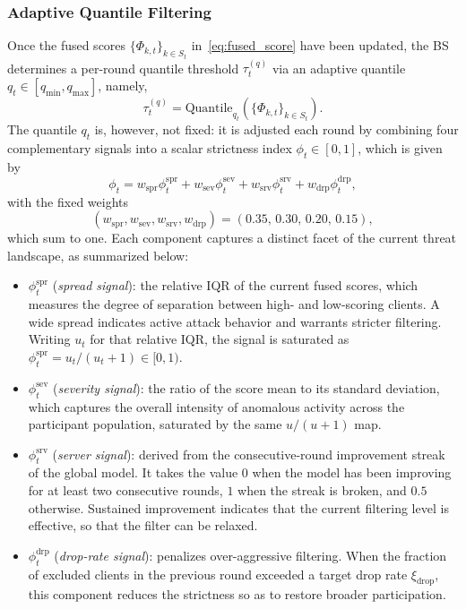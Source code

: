 \documentclass[journal]{IEEEtran}
\begin{document}
\subsubsection{Adaptive Quantile Filtering}
Once the fused scores $\{\Phi_{k,t}\}_{k\in S_t}$ in~\eqref{eq:fused_score} have been updated, the BS determines a per-round quantile threshold $\tau_t^{(q)}$ via an adaptive quantile $q_t \in [q_{\min}, q_{\max}]$, namely,
\begin{equation}
\tau_t^{(q)} = \text{Quantile}_{q_t}\!\left(\{\Phi_{k,t}\}_{k \in S_t}\right).
\label{eq:filt_threshold}
\end{equation}
The quantile $q_t$ is, however, not fixed: it is adjusted each round by combining four complementary signals into a scalar strictness index $\phi_t \in [0,1]$, which is given by
\begin{equation}
\phi_t = w_{\mathrm{spr}} \phi_t^{\mathrm{spr}} + w_{\mathrm{sev}} \phi_t^{\mathrm{sev}} + w_{\mathrm{srv}} \phi_t^{\mathrm{srv}} + w_{\mathrm{drp}} \phi_t^{\mathrm{drp}},
\label{eq:strictness}
\end{equation}
with the fixed weights
\begin{equation}
(w_{\mathrm{spr}}, w_{\mathrm{sev}}, w_{\mathrm{srv}}, w_{\mathrm{drp}}) = (0.35,\, 0.30,\, 0.20,\, 0.15),
\label{eq:w_values}
\end{equation}
which sum to one. Each component captures a distinct facet of the current threat landscape, as summarized below:
\begin{itemize}
    \item $\phi_t^{\mathrm{spr}}$ (\emph{spread signal}): the relative IQR of the current fused scores, which measures the degree of separation between high- and low-scoring clients. A wide spread indicates active attack behavior and warrants stricter filtering. Writing $u_t$ for that relative IQR, the signal is saturated as $\phi_t^{\mathrm{spr}} = u_t/(u_t+1) \in [0,1)$.
    \item $\phi_t^{\mathrm{sev}}$ (\emph{severity signal}): the ratio of the score mean to its standard deviation, which captures the overall intensity of anomalous activity across the participant population, saturated by the same $u/(u+1)$ map.
    \item $\phi_t^{\mathrm{srv}}$ (\emph{server signal}): derived from the consecutive-round improvement streak of the global model. It takes the value $0$ when the model has been improving for at least two consecutive rounds, $1$ when the streak is broken, and $0.5$ otherwise. Sustained improvement indicates that the current filtering level is effective, so that the filter can be relaxed.
    \item $\phi_t^{\mathrm{drp}}$ (\emph{drop-rate signal}): penalizes over-aggressive filtering. When the fraction of excluded clients in the previous round exceeded a target drop rate $\xi_{\mathrm{drop}}$, this component reduces the strictness so as to restore broader participation.
\end{itemize}
\end{document}
